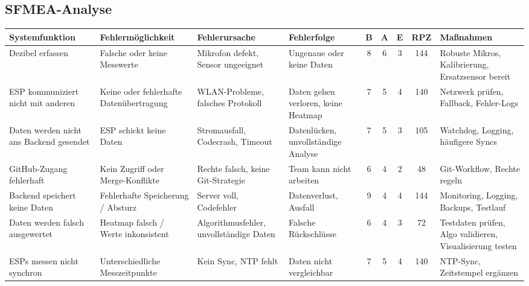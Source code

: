 \begin{landscape}
\chapter{SFMEA-Analyse}
\label{cha:sfmea}
\small
\begin{longtable}{|p{3.4cm}|p{3.4cm}|p{3.4cm}|p{3.4cm}|c|c|c|c|p{3.4cm}|}

    \hline
    \textbf{Systemfunktion} & \textbf{Fehlermöglichkeit} & \textbf{Fehlerursache} & \textbf{Fehlerfolge} & \textbf{B} & \textbf{A} & \textbf{E} & \textbf{RPZ} & \textbf{Maßnahmen} \\
    \hline
    \endhead

    Dezibel erfassen & Falsche oder keine Messwerte & Mikrofon defekt, Sensor ungeeignet & Ungenaue oder keine Daten & 8 & 6 & 3 & 144 & Robuste Mikros, Kalibrierung, Ersatzsensor bereit \\
    \hline
    ESP kommuniziert nicht mit anderen & Keine oder fehlerhafte Datenübertragung & WLAN-Probleme, falsches Protokoll & Daten gehen verloren, keine Heatmap & 7 & 5 & 4 & 140 & Netzwerk prüfen, Fallback, Fehler-Logs \\
    \hline
    Daten werden nicht ans Backend gesendet & ESP schickt keine Daten & Stromausfall, Codecrash, Timeout & Datenlücken, unvollständige Analyse & 7 & 5 & 3 & 105 & Watchdog, Logging, häufigere Syncs \\
    \hline
    GitHub-Zugang fehlerhaft & Kein Zugriff oder Merge-Konflikte & Rechte falsch, keine Git-Strategie & Team kann nicht arbeiten & 6 & 4 & 2 & 48 & Git-Workflow, Rechte regeln \\
    \hline
    Backend speichert keine Daten & Fehlerhafte Speicherung / Absturz & Server voll, Codefehler & Datenverlust, Ausfall & 9 & 4 & 4 & 144 & Monitoring, Logging, Backups, Testlauf \\
    \hline
    Daten werden falsch ausgewertet & Heatmap falsch / Werte inkonsistent & Algorithmusfehler, unvollständige Daten & Falsche Rückschlüsse & 6 & 4 & 3 & 72 & Testdaten prüfen, Algo validieren, Visualisierung testen \\
    \hline
    ESPs messen nicht synchron & Unterschiedliche Messzeitpunkte & Kein Sync, NTP fehlt & Daten nicht vergleichbar & 7 & 5 & 4 & 140 & NTP-Sync, Zeitstempel ergänzen \\
    \hline

\end{longtable}
\end{landscape}
